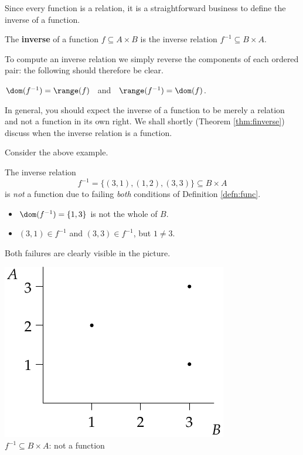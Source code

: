 Since every function is a relation, it is a straightforward business to define the inverse of a function.

\begin{defn}
The \textbf{inverse} of a function $f\subseteq A\times B$ is the inverse relation $f^{-1}\subseteq B\times A$.
\end{defn}

\noindent To compute an inverse relation we simply reverse the components of each ordered pair: the following should therefore be clear.

\begin{thm}\label{thm:inversedomrange}
$\dom(f^{-1})=\range(f)$ \ and \ $\range(f^{-1})=\dom(f)$.
\end{thm}

\noindent In general, you should expect the inverse of a function to be merely a relation and not a function in its own right. We shall shortly (Theorem \ref{thm:finverse}) discuss when the inverse relation is a function.

\begin{example}[cont.]
Consider the above example.\\[5pt]
\noindent\begin{minipage}{0.62\textwidth}
The inverse relation
\[f^{-1}=\{(3,1),(1,2),(3,3)\}\subseteq B\times A\]
is \emph{not} a function due to failing \emph{both} conditions of Definition \ref{defn:func}.
\begin{itemize}
  \item $\dom(f^{-1})=\{1,3\}$ is not the whole of $B$.
  \item $(3,1)\in f^{-1}$ and $(3,3)\in f^{-1}$, but $1\neq 3$.
\end{itemize}
Both failures are clearly visible in the picture.
\end{minipage}\hfill\begin{minipage}{0.33\textwidth}
\centering
\includegraphics[width=\textwidth]{relations-19-reln1}\\
$f^{-1}\subseteq B\times A$: not a function
\end{minipage}
\end{example}

